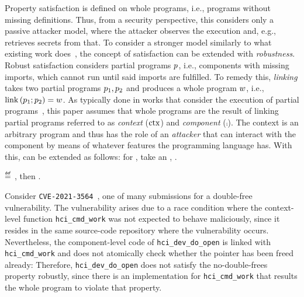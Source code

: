 \documentclass[utf8,acmsmall,review,screen,dvipsnames,anonymous]{acmart}
\begin{document}
Property satisfaction is defined on whole programs, i.e., programs without missing definitions.
Thus, from a security perspective, this considers only a passive attacker model, where the attacker observes the execution and, e.g., retrieves secrets from that.
To consider a stronger model similarly to what existing work does~\cite{abate2019jour,abate2021extacc,maffeis2008code-carrying,gordon2003authenticity,fournet2007authorization,bengtson2011refine,backes2014uniontyps}, the concept of satisfaction can be extended with {\em robustness}.
Robust satisfaction considers partial programs $\progvar$, i.e., components with missing imports, which cannot run until said imports are fulfilled.
To remedy this, {\em linking} takes two partial programs $\progvar[_{1}],\progvar[_{2}]$ and produces a whole program $\wholeprogvar$, i.e., $\link{\progvar[_{1}]}{\progvar[_{2}]}=\wholeprogvar$.
As typically done in works that consider the execution of partial programs~\cite{abate2019jour,devriese2018parametricity,patrignani2021rsc,korashy2021capableptrs,strydonck2019lincap,devriese2017modular,bowman2015noninterference,ahmed2011equivcps,patterson2017linkingtyps},
this paper assumes that whole programs are the result of linking partial programs referred to as {\em context} ($\ctx$) and {\em component} ($\comp$).
The context is an arbitrary program and thus has the role of an {\em attacker} that can interact with the component by means of whatever features the programming language has.
With this,  can be extended as follows: for , take an , .

\begin{definition}\label{def:proprsat}
  \bul{$\rsat{\progvar}{\pi}$}
  $\isdef$ , then \oul{$\sat{\wholeprogvar}{\pi}$}.
\end{definition}

\begin{example}
  Consider \texttt{CVE-2021-3564}~\cite{doublefree-bluetooth}, one of many submissions for a double-free vulnerability.
  The vulnerability arises due to a race condition where the context-level function \texttt{hci\_cmd\_work} was not expected to behave maliciously, since it resides in the same source-code repository where the vulnerability occurs.
  Nevertheless, the component-level code of \texttt{hci\_dev\_do\_open} is linked with \texttt{hci\_cmd\_work} and does not atomically check whether the pointer has been freed already:
  Therefore, \texttt{hci\_dev\_do\_open} does not satisfy the no-double-frees property robustly, since there is an implementation for \texttt{hci\_cmd\_work} that results the whole program to violate that property.
\end{example}
\end{document}
